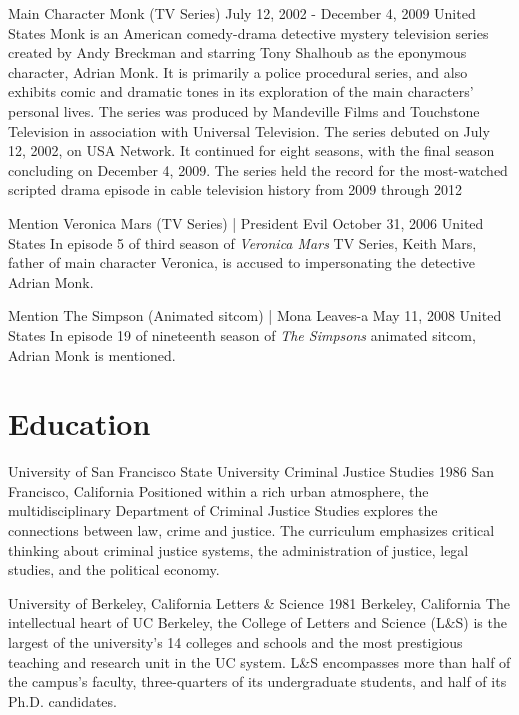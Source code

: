\documentclass[]{mcec-cv}
\begin{document}
\begin{mcecllist}
\litem
{Main Character}
{Monk (TV Series)}
{July 12, 2002 - December 4, 2009}
{United States}
{Monk is an American comedy-drama detective mystery television series created by Andy Breckman and starring Tony Shalhoub as the eponymous character, Adrian Monk. It is primarily a police procedural series, and also exhibits comic and dramatic tones in its exploration of the main characters' personal lives. The series was produced by Mandeville Films and Touchstone Television in association with Universal Television. The series debuted on July 12, 2002, on USA Network. It continued for eight seasons, with the final season concluding on December 4, 2009. The series held the record for the most-watched scripted drama episode in cable television history from 2009 through 2012}

\litem
{Mention}
{Veronica Mars (TV Series) | President Evil}
{October 31, 2006}
{United States}
{In episode 5 of third season of \emph{Veronica Mars} TV Series, Keith Mars, father of main character Veronica, is accused to impersonating the detective Adrian Monk.}

\litem
{Mention}
{The Simpson (Animated sitcom) | Mona Leaves-a}
{May 11, 2008}
{United States}
{In episode 19 of nineteenth season of \emph{The Simpsons} animated sitcom, Adrian Monk is mentioned.}

\end{mcecllist}

\section{Education}

\begin{mcecllist}

\litem
{University of San Francisco State University}
{Criminal Justice Studies}
{1986}
{San Francisco, California}
{Positioned within a rich urban atmosphere, the multidisciplinary Department of Criminal Justice Studies explores the connections between law, crime and justice. The curriculum emphasizes critical thinking about criminal justice systems, the administration of justice, legal studies, and the political economy.}

\litem
{University of Berkeley, California}
{Letters \& Science}
{1981}
{Berkeley, California}
{The intellectual heart of UC Berkeley, the College of Letters and Science (L\&S) is the largest of the university's 14 colleges and schools and the most prestigious teaching and research unit in the UC system. L\&S encompasses more than half of the campus's faculty, three-quarters of its undergraduate students, and half of its Ph.D. candidates.}

\end{mcecllist}
\end{document}
